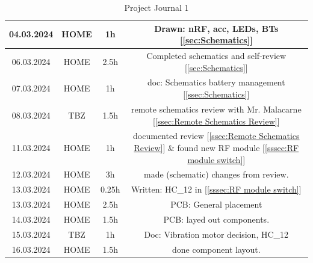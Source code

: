 \begin{table}[H]
\begin{tabular}{||c | c | c || c||}
 \hline
    04.03.2024 & HOME & 1h & Drawn: nRF, acc, LEDs, BTs [\ref{sec:Schematics}] \\ 
 \hline
    06.03.2024 & HOME & 2.5h & Completed schematics and self-review [\ref{sec:Schematics}] \\ 
 \hline
    07.03.2024 & HOME & 1h & doc: Schematics battery management [\ref{ssec:Schematics}] \\ 
 \hline
     08.03.2024 & TBZ & 1.5h & remote schematics review with Mr. Malacarne [\ref{ssec:Remote Schematics Review}] \\ 
 \hline
     11.03.2024 & HOME & 1h & documented review [\ref{ssec:Remote Schematics Review}] \& found new RF module [\ref{sssec:RF module switch}] \\ 
 \hline
     12.03.2024 & HOME & 3h & made (schematic) changes from review. \\ 
 \hline
     13.03.2024 & HOME & 0.25h & Written: HC\_12 in [\ref{sssec:RF module switch}] \\ 
 \hline
     13.03.2024 & HOME & 2.5h & PCB: General placement \\ 
 \hline
     14.03.2024 & HOME & 1.5h & PCB: layed out components. \\ 
 \hline
     15.03.2024 & TBZ & 1h & Doc: Vibration motor decision, HC\_12\\ 
 \hline
     16.03.2024 & HOME & 1.5h & done component layout. \\ 
 \hline
\end{tabular}
    \caption{Project Journal 1}
    \label{tab:Project Journal 1}
\end{table}
